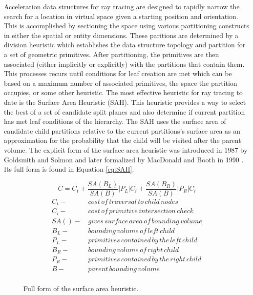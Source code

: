 \documentclass[12pt, a4paper]{article}
\begin{document}
Acceleration data structures for ray tracing are designed to rapidly narrow the search for a location in virtual space given a starting position and orientation. This is accomplished by sectioning the space using various partitioning constructs in either the spatial or entity dimensions. These paritions are determined by a division heuristic which establishes the data structure topology and partition for a set of geometric primitives. After partitioning, the primitives are then associated (either implicitly or explicitly) with the partitions that contain them. This processes recurs until conditions for leaf creation are met which can be based on a maximum number of associated primitives, the space the partition occupies, or some other heuristic. The most effective heuristic for ray tracing to date is the Surface Area Heuristic (SAH). This heuristic provides a way to select the best of a set of candidate split planes and also determine if current partition has met leaf conditions of the hierarchy. The SAH uses the surface area of candidate child partitions relative to the current partitions's surface area as an approximation for the probability that the child will be visited after the parent volume. The explicit form of the surface area heuristic was introduced in 1987 by Goldsmith and Solmon \cite{Goldsmith_1987} and later formalized by MacDonald and Booth in 1990 \cite{MacDonald_1990}. Its full form is found in Equation \ref{eq:SAH}.


\begin{figure}[H]
  \begin{equation}
    C =  C_{t} + \frac{SA(B_{L})}{SA(B)} |P_{L}|C_{i} +  \frac{SA(B_{R})}{SA(B)} |P_{R}|C_{i}
    \label{eq:SAH}
  \end{equation}
  \begin{align*}
    C_{t} - & \,cost\, of\, traversal\, to\, child\, nodes \\
    C_{i} - & \, cost\, of\, primitive\, intersection\, check\, \\
    SA() - & \, gives\, surface\, area\, of\, bounding\, volume \\
    B_{L} - &  \, bounding\, volume\, of\, left\, child \\
    P_{L} - & \, primitives\, contained\, by\, the\, left\, child  \\
    B_{R} - & \, bounding\, volume\, of\, right\, child \\
    P_{R} - & \, primitives\, contained\, by\, the\, right\, child \\
    B - & \, parent\, bounding\, volume \\
  \end{align*}
  \caption{Full form of the surface area heuristic.}
  \label{fig:SAH}
\end{figure}
\end{document}
